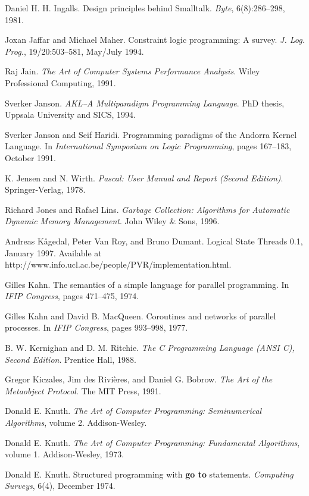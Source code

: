 \begin{thebibliography}{213}
Daniel H. H. Ingalls. Design principles behind Smalltalk. \emph{Byte}, 6(8):286–298, 1981.

Joxan Jaffar and Michael Maher. Constraint logic programming: A survey. \emph{J. Log. Prog.}, 19/20:503–581, May/July 1994.

Raj Jain. \emph{The Art of Computer Systems Performance Analysis}. Wiley Professional Computing, 1991.

Sverker Janson. \emph{AKL–A Multiparadigm Programming Language}. PhD thesis, Uppsala University and SICS, 1994.

Sverker Janson and Seif Haridi. Programming paradigms of the Andorra Kernel Language. In \emph{International Symposium on Logic Programming}, pages 167–183, October 1991.

K. Jensen and N. Wirth. \emph{Pascal: User Manual and Report (Second Edition)}. Springer-Verlag, 1978.

Richard Jones and Rafael Lins. \emph{Garbage Collection: Algorithms for Automatic Dynamic Memory Management}. John Wiley \& Sons, 1996.

Andreas K\r{a}gedal, Peter Van Roy, and Bruno Dumant. Logical State Threads 0.1, January 1997. Available at http://www.info.ucl.ac.be/people/PVR/implementation.html.

Gilles Kahn. The semantics of a simple language for parallel programming. In \emph{IFIP Congress}, pages 471–475, 1974.

Gilles Kahn and David B. MacQueen. Coroutines and networks of parallel processes. In \emph{IFIP Congress}, pages 993–998, 1977.

B. W. Kernighan and D. M. Ritchie. \emph{The C Programming Language (ANSI C), Second Edition}. Prentice Hall, 1988.

Gregor Kiczales, Jim des Rivi\`eres, and Daniel G. Bobrow. \emph{The Art of the Metaobject Protocol}. The MIT Press, 1991.

Donald E. Knuth. \emph{The Art of Computer Programming: Seminumerical Algorithms}, volume 2. Addison-Wesley.

Donald E. Knuth. \emph{The Art of Computer Programming: Fundamental Algorithms}, volume 1. Addison-Wesley, 1973.

Donald E. Knuth. Structured programming with \textbf{go to} statements. \emph{Computing Surveys}, 6(4), December 1974.


\end{thebibliography}

